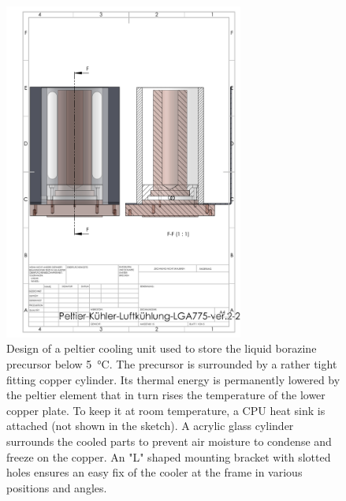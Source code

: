 \begin{figure} \centering
\includegraphics[width=0.7\textwidth]{./includes/chapter/backmatter/Peltier-LGA775.pdf}
\caption{Design of a peltier cooling unit used to store the liquid borazine precursor below \SI{5}{\celsius}. The precursor is surrounded by a rather tight fitting copper cylinder. Its thermal energy is permanently lowered by the peltier element that in turn rises the temperature of the lower copper plate. To keep it at room temperature, a CPU heat sink is attached (not shown in the sketch). A acrylic glass cylinder surrounds the cooled parts to prevent air moisture to condense and freeze on the copper. An "L" shaped mounting bracket with slotted holes ensures an easy fix of the cooler at the frame in various positions and angles.}
\label{fig:peltier-cooler}
\end{figure}

